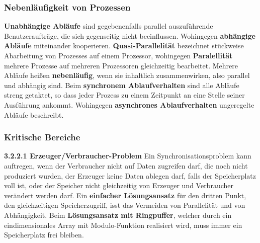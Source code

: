\documentclass{article}
\begin{document}
\subsubsection{Nebenläufigkeit von Prozessen}
    \textbf{Unabhängige Abläufe} sind gegebenenfalls parallel auszuführende Benutzeraufträge, die sich gegenseitig nicht beeinflussen. Wohingegen \textbf{abhängige Abläufe} miteinander kooperieren.\newline
    \textbf{Quasi-Parallelität} bezeichnet stückweise Abarbeitung von Prozesses auf einem Prozessor, wohingegen \textbf{Paralellität} mehrere Prozesse auf mehreren Prozessoren gleichzeitig bearbeitet.\newline
    Mehrere Abläufe heißen \textbf{nebenläufig}, wenn sie inhaltlich zusammenwirken, also parallel und abhängig sind.\newline
    Beim \textbf{synchronem Ablaufverhalten} sind alle Abläufe streng getaktet, so dass jeder Prozess zu einem Zeitpunkt an eine Stelle seiner Ausführung ankommt. Wohingegen \textbf{asynchrones Ablaufverhalten} ungeregelte Abläufe beschreibt.
\subsubsection{Kritische Bereiche}
    \textbf{3.2.2.1 Erzeuger/Verbraucher-Problem}\newline
    Ein Synchronisationsproblem kann auftregen, wenn der Verbraucher nicht auf Daten zugreifen darf, die noch nicht produziert wurden, der Erzeuger keine Daten ablegen darf, falls der Speicherplatz voll ist, oder der Speicher nicht gleichzeitig von Erzeuger und Verbraucher verändert werden darf.\newline
    Ein \textbf{einfacher Lösungsansatz} für den dritten Punkt, den gleichzeitigen Speicherzugriff, isst das Vermeiden von Parallelität und von Abhängigkeit.\newline
    Beim \textbf{Lösungsansatz mit Ringpuffer}, welcher durch ein eindimensionales Array mit Modulo-Funktion realisiert wird, muss immer ein Speicherplatz frei bleiben.
\end{document}
